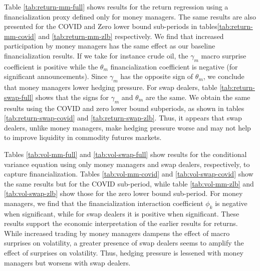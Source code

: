  
Table \ref{tab:return-mm-full} shows results for the return regression using a financialization proxy defined only for money managers. The same results are also presented for the COVID and Zero lower bound sub-periods in tables\ref{tab:return-mm-covid} and \ref{tab:return-mm-zlb} respectively. We find that increased participation by money managers has the same effect as our baseline financialization results. If we take for instance crude oil, the $\gamma_m$ macro surprise coefficient is positive while the  $\theta_m$ financialization coefficient is negative (for significant announcements). Since $\gamma_m$ has the opposite sign of $\theta_m$, we conclude that money managers lower hedging pressure. For swap dealers, table \ref{tab:return-swap-full} shows that the signs for $\gamma_m$ and $\theta_m$ are the same. We obtain the same results using the COVID and zero lower bound subperiods, as shown in tables \ref{tab:return-swap-covid} and \ref{tab:return-swap-zlb}.  Thus, it appears that swap dealers, unlike money managers, make hedging pressure worse and may not help to improve liquidity in commodity futures markets. 




Tables \ref{tab:vol-mm-full} and \ref{tab:vol-swap-full} show results for the conditional variance equation using only money managers and swap dealers, respectively, to capture financialization. Tables \ref{tab:vol-mm-covid} and \ref{tab:vol-swap-covid} show the same results but for the COVID sub-period, while table \ref{tab:vol-mm-zlb} and \ref{tab:vol-swap-zlb} show those for the zero lower bound sub-period. For money managers, we find that the financialization interaction coefficient $\phi_k$ is negative when significant, while for swap dealers it is positive when significant. These results support the economic interpretation of the earlier results for returns. While increased trading by money managers dampens the effect of macro surprises on volatility, a greater presence of swap dealers seems to amplify the effect of surprises on volatility. Thus, hedging pressure is lessened with money managers but worsens with swap dealers. 




